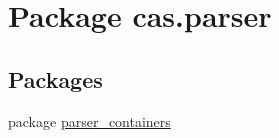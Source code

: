 \hypertarget{namespacecas_1_1parser}{\section{Package cas.\-parser}
\label{namespacecas_1_1parser}
}
\subsection*{Packages}
\begin{DoxyCompactItemize}
\item 
package \hyperlink{namespacecas_1_1parser_1_1parser__containers}{parser\-\_\-containers}
\end{DoxyCompactItemize}
